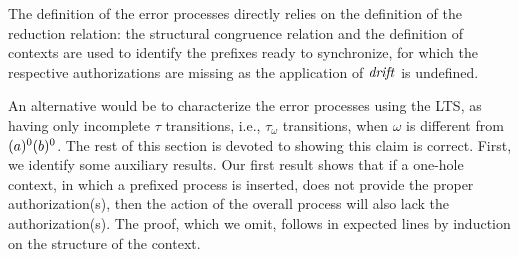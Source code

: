 The definition of the error processes directly relies on the definition of the reduction relation: the structural congruence relation and the definition of contexts are used to identify the prefixes ready to synchronize, for which the respective authorizations are missing as the application of $\mathit {drift}$ is undefined.

An alternative would be to characterize the error processes using the LTS, as having only incomplete $\tau$ transitions, i.e., $\tau_\omega$ transitions, when $\omega$ is
different from $(a)^{0}(b)^0$.  
The rest of this section is devoted to showing this claim is correct. First, we identify some auxiliary results. 
Our first result shows that if a one-hole context, in which a prefixed process is inserted, does not provide the proper authorization(s), then the action of the overall process will also lack the authorization(s). The proof, which we omit, follows in expected lines by induction on the structure of the context. 


